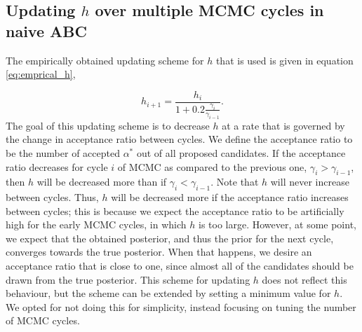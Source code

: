 \documentclass[11pt,a4paper]{article}
\begin{document}
\subsection[Task 1]{Updating $h$ over multiple MCMC cycles in naive ABC}
\label{sec:result_h}

The empirically obtained updating scheme for $h$ that is used is given in equation \eqref{eq:emprical_h},

\begin{equation}
    \label{eq:emprical_h}
    h_{i+1} = \frac{h_i}{1+0.2\frac{\gamma_i}{\gamma_{i-1}}}.
\end{equation}
The goal of this updating scheme is to decrease $h$ at a rate that is governed by the change in acceptance ratio between cycles. We define the acceptance ratio to be the number of accepted $\alpha^*$ out of all proposed candidates. If the acceptance ratio decreases for cycle $i$ of MCMC as compared to the previous one, $\gamma_i>\gamma_{i-1}$, then $h$ will be decreased more than if $\gamma_i<\gamma_{i-1}$. Note that $h$ will never increase between cycles. Thus, $h$ will be decreased more if the acceptance ratio increases between cycles; this is because we expect the acceptance ratio to be artificially high for the early MCMC cycles, in which $h$ is too large. However, at some point, we expect that the obtained posterior, and thus the prior for the next cycle, converges towards the true posterior. When that happens, we desire an acceptance ratio that is close to one, since almost all of the candidates should be drawn from the true posterior. This scheme for updating $h$ does not reflect this behaviour, but the scheme can be extended by setting a minimum value for $h$. We opted for not doing this for simplicity, instead focusing on tuning the number of MCMC cycles.
\end{document}
